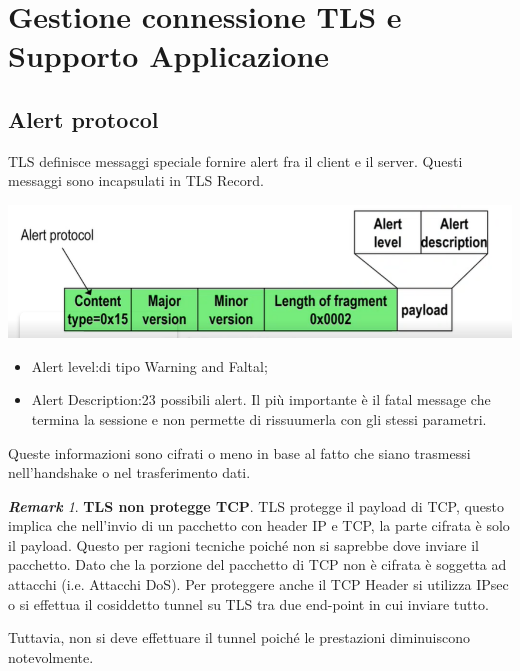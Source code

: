 \documentclass{book}
\theoremstyle{remark}
\newtheorem*{remark}{\textbf{Remark}}
\begin{document}
\section{Gestione connessione TLS e Supporto Applicazione}
\subsection{Alert protocol}
TLS definisce messaggi speciale fornire alert fra il client e il server\@. Questi messaggi sono incapsulati in TLS Record\@.
\begin{center}
	\includegraphics[scale=0.6]{2021-12-09-17-29-16.png}
\end{center}
\begin{itemize}
	\item Alert level:\@Alert di tipo Warning and Faltal;\@
	\item Alert Description:\@23 possibili alert\@. Il più importante è il fatal message che termina la sessione e non permette di rissuumerla con gli stessi parametri\@.
\end{itemize}
Queste informazioni sono cifrati o meno in base al fatto che siano trasmessi nell'handshake o nel trasferimento dati\@.
\begin{remark}
	\textbf{TLS non protegge TCP}\@. TLS protegge il payload di TCP, questo implica che nell'invio di un pacchetto con header IP e TCP, la parte cifrata è solo il payload\@. Questo per ragioni tecniche poiché non si saprebbe dove inviare il pacchetto\@.\newline
	Dato che la porzione del pacchetto di TCP non è cifrata è soggetta ad attacchi (i\@.e\@. Attacchi DoS)\@. Per proteggere anche il TCP Header si utilizza IPsec o si effettua il cosiddetto tunnel su TLS tra due end-point in cui inviare tutto\@.
\end{remark}
Tuttavia, non si deve effettuare il tunnel poiché le prestazioni diminuiscono notevolmente\@.
\end{document}
